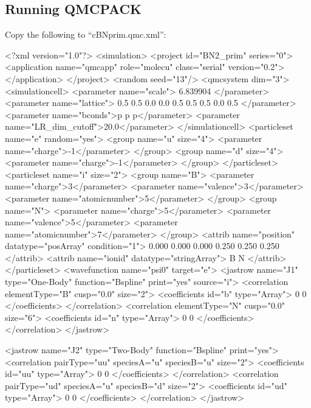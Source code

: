 \subsection*{Running QMCPACK}
Copy the following to ``cBNprim.qmc.xml'':
\begin{lstcpp}
<?xml version="1.0"?>
<simulation>
  <project id="BN2_prim" series="0">
    <application name="qmcapp" role="molecu" class="serial" version="0.2">
    </application>
  </project>
  <random seed="13"/>
  <qmcsystem dim="3">
    <simulationcell>
      <parameter name="scale"> 6.839904 </parameter>
      <parameter name="lattice">
        0.5 0.5 0.0
        0.0 0.5 0.5
        0.5 0.0 0.5
      </parameter>
      <parameter name="bconds">p p p</parameter>
      <parameter name="LR_dim_cutoff">20.0</parameter>
    </simulationcell>
    <particleset name="e" random="yes">
      <group name="u" size="4">
        <parameter name="charge">-1</parameter>
      </group>
      <group name="d" size="4">
        <parameter name="charge">-1</parameter>
      </group>
    </particleset>
    <particleset name="i" size="2">
      <group name="B">
        <parameter name="charge">3</parameter>
        <parameter name="valence">3</parameter>
        <parameter name="atomicnumber">5</parameter>
      </group>
      <group name="N">
        <parameter name="charge">5</parameter>
        <parameter name="valence">5</parameter>
        <parameter name="atomicnumber">7</parameter>
      </group>
      <attrib name="position" datatype="posArray" condition="1">
        0.000 0.000 0.000
        0.250 0.250 0.250
      </attrib>
      <attrib name="ionid" datatype="stringArray">
        B N
      </attrib>
    </particleset>
    <wavefunction name="psi0" target="e">
      <jastrow name="J1" type="One-Body" function="Bspline" print="yes" source="i">
        <correlation elementType="B" cusp="0.0" size="2">
          <coefficients id="b" type="Array">
            0 0
          </coefficients>
        </correlation>
        <correlation elementType="N" cusp="0.0" size="6">
          <coefficients id="n" type="Array">
            0 0
          </coefficients>
        </correlation>
      </jastrow>
     
      <jastrow name="J2" type="Two-Body" function="Bspline" print="yes">
        <correlation pairType="uu" speciesA="u" speciesB="u" size="2">
          <coefficients id="uu" type="Array">
            0 0
          </coefficients>
        </correlation>
        <correlation pairType="ud" speciesA="u" speciesB="d" size="2">
          <coefficients id="ud" type="Array">
            0 0
          </coefficients>
        </correlation>
      </jastrow>
     

\end{lstcpp}
